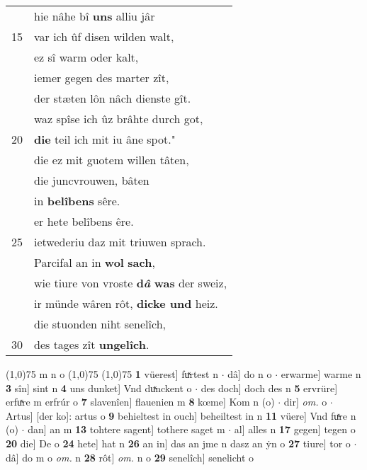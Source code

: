 \documentclass[8pt,a4paper,notitlepage]{article}
\begin{document}
\begin{table}[ht]
\begin{minipage}[t]{0.5\linewidth}
\begin{tabular}{rl}
 & hie nâhe bî \textbf{uns} alliu jâr\\ 
15 & var ich ûf disen wilden walt,\\ 
 & ez sî warm oder kalt,\\ 
 & iemer gegen des marter zît,\\ 
 & der stæten lôn nâch dienste gît.\\ 
 & waz spîse ich ûz brâhte durch got,\\ 
20 & \textbf{die} teil ich mit iu âne spot."\\ 
 & die ez mit guotem willen tâten,\\ 
 & die juncvrouwen, bâten\\ 
 & in \textbf{belîbens} sêre.\\ 
 & er hete belîbens êre.\\ 
25 & ietwederiu daz mit triuwen sprach.\\ 
 & Parcifal an in \textbf{wol} \textbf{sach},\\ 
 & wie tiure von vroste \textbf{d\textit{â}} \textbf{was} der sweiz,\\ 
 & ir münde wâren rôt, \textbf{dicke und} heiz.\\ 
 & die stuonden niht senelîch,\\ 
30 & des tages zît \textbf{ungelîch}.\\ 
\end{tabular}
\scriptsize
\line(1,0){75} \newline
m n o \newline
\line(1,0){75} \newline
\newline
\line(1,0){75} \newline
\textbf{1} vüerest] fuͯrtest n  $\cdot$ dâ] do n o  $\cdot$ erwarme] warme n \textbf{3} sîn] sint n \textbf{4} uns dunket] Vnd duͯnckent o  $\cdot$ des doch] doch des n \textbf{5} ervrüre] erfuͯre m erfrúr o \textbf{7} slavenîen] flauenien m \textbf{8} kœme] Kom n (o)  $\cdot$ dir] \textit{om.} o  $\cdot$ Artus] [der ko]: artus o \textbf{9} behieltest in ouch] beheiltest in n \textbf{11} vüere] Vnd fuͯre n (o)  $\cdot$ dan] an m \textbf{13} tohtere sagent] tothere saget m  $\cdot$ al] alles n \textbf{17} gegen] tegen o \textbf{20} die] De o \textbf{24} hete] hat n \textbf{26} an in] das an jme n dasz an ẏn o \textbf{27} tiure] tor o  $\cdot$ dâ] do m o \textit{om.} n \textbf{28} rôt] \textit{om.} n o \textbf{29} senelîch] senelicht o \newline
\end{minipage}
\end{table}
\end{document}
